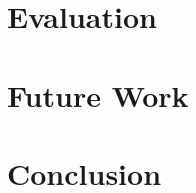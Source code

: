\documentclass[11pt,
a4paper,
parskip=half, %
BCOR=10mm, %
ngerman, english
]{scrbook}
\begin{document}
\chapter{Evaluation}
\label{eval}


\chapter{Future Work}
\label{futrWork}


	\setlength{\abovedisplayskip}{0.25cm}
\setlength{\belowdisplayskip}{0.25cm}
\setlength{\abovedisplayshortskip}{0.25cm}
\setlength{\belowdisplayshortskip}{0.25cm}
\chapter{Conclusion}
\label{concl}



\pagebreak



\listoffigures
\end{document}
